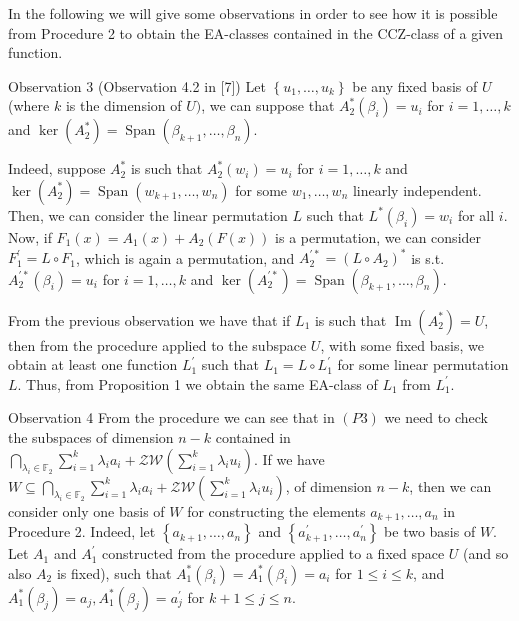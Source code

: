 \documentclass[10pt]{article}
\begin{document}
In the following we will give some observations in order to see how it is possible from Procedure 2 to obtain the EA-classes contained in the CCZ-class of a given function.

Observation 3 (Observation 4.2 in [7]) Let $\left\{u_{1}, \ldots, u_{k}\right\}$ be any fixed basis of $U$ (where $k$ is the dimension of $U)$, we can suppose that $A_{2}^{*}\left(\beta_{i}\right)=u_{i}$ for $i=1, \ldots, k$ and $\operatorname{ker}\left(A_{2}^{*}\right)= \operatorname{Span}\left(\beta_{k+1}, \ldots, \beta_{n}\right)$.

Indeed, suppose $A_{2}^{*}$ is such that $A_{2}^{*}\left(w_{i}\right)=u_{i}$ for $i=1, \ldots, k$ and $\operatorname{ker}\left(A_{2}^{*}\right)= \operatorname{Span}\left(w_{k+1}, \ldots, w_{n}\right)$ for some $w_{1}, \ldots, w_{n}$ linearly independent. Then, we can consider the linear permutation $L$ such that $L^{*}\left(\beta_{i}\right)=w_{i}$ for all $i$. Now, if $F_{1}(x)=A_{1}(x)+A_{2}(F(x))$ is a permutation, we can consider $F_{1}^{\prime}=L \circ F_{1}$, which is again a permutation, and $A_{2}^{\prime *}=\left(L \circ A_{2}\right)^{*}$ is s.t. $A_{2}^{\prime *}\left(\beta_{i}\right)=u_{i}$ for $i=1, \ldots, k$ and $\operatorname{ker}\left(A_{2}^{\prime *}\right)=\operatorname{Span}\left(\beta_{k+1}, \ldots, \beta_{n}\right)$.

From the previous observation we have that if $L_{1}$ is such that $\operatorname{Im}\left(A_{2}^{*}\right)=U$, then from the procedure applied to the subspace $U$, with some fixed basis, we obtain at least one function $L_{1}^{\prime}$ such that $L_{1}=L \circ L_{1}^{\prime}$ for some linear permutation $L$. Thus, from Proposition 1 we obtain the same EA-class of $L_{1}$ from $L_{1}^{\prime}$.

Observation 4 From the procedure we can see that in $(P 3)$ we need to check the subspaces of dimension $n-k$ contained in $\bigcap_{\lambda_{i} \in \mathbb{F}_{2}} \sum_{i=1}^{k} \lambda_{i} a_{i}+\mathcal{Z} \mathcal{W}\left(\sum_{i=1}^{k} \lambda_{i} u_{i}\right)$. If we have $W \subseteq \bigcap_{\lambda_{i} \in \mathbb{F}_{2}} \sum_{i=1}^{k} \lambda_{i} a_{i}+\mathcal{Z} \mathcal{W}\left(\sum_{i=1}^{k} \lambda_{i} u_{i}\right)$, of dimension $n-k$, then we can consider only one basis of $W$ for constructing the elements $a_{k+1}, \ldots, a_{n}$ in Procedure 2. Indeed, let $\left\{a_{k+1}, \ldots, a_{n}\right\}$ and $\left\{a_{k+1}^{\prime}, \ldots, a_{n}^{\prime}\right\}$ be two basis of $W$. Let $A_{1}$ and $A_{1}^{\prime}$ constructed from the procedure applied to a fixed space $U$ (and so also $A_{2}$ is fixed), such that $A_{1}^{*}\left(\beta_{i}\right)=A_{1}^{*}\left(\beta_{i}\right)=a_{i}$ for $1 \leq i \leq k$, and $A_{1}^{*}\left(\beta_{j}\right)=a_{j}, A_{1}^{*}\left(\beta_{j}\right)=a_{j}^{\prime}$ for $k+1 \leq j \leq n$.
\end{document}
